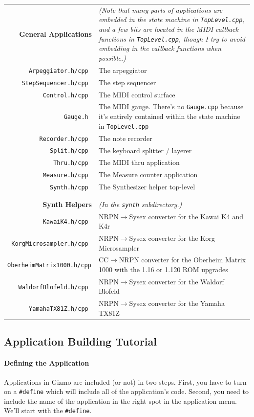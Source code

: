 \documentclass{article}
\begin{document}
\begin{tabular}{r@{\hspace{2em}}p{4.7in}}
	\bf General Applications  &		\it (Note that many parts of applications are embedded
				in the state machine in \texttt{TopLevel.cpp}, and a few bits
				are located in the MIDI callback functions in
				\texttt{TopLevel.cpp}, though I try to avoid embedding
				in the callback functions when possible.)\\
	\tt Arpeggiator.h/cpp & 	The arpeggiator \\ 
	\tt StepSequencer.h/cpp  & 	The step sequencer \\ 
	\tt Control.h/cpp	& 	The MIDI control surface \\ 
	\tt Gauge.h	& 		The MIDI gauge.  There's no \texttt{Gauge.cpp} because it's
				entirely contained within the state machine in
				{\texttt{TopLevel.cpp}} \\ 
	\tt Recorder.h/cpp	& 	The note recorder \\ 
	\tt Split.h/cpp	 & 	The keyboard splitter / layerer \\ 
	\tt Thru.h/cpp & 		The MIDI thru application \\ 
	\tt Measure.h/cpp	& The Measure counter application \\ 
	\tt Synth.h/cpp	& The Synthesizer helper top-level \\ 
\\
\\
	\bf Synth Helpers  & \it (In the \texttt{synth} subdirectory.)\\
	\tt KawaiK4.h/cpp	& 	NRPN\(\rightarrow\)Sysex converter for the Kawai K4 and K4r\\ 
	\tt KorgMicrosampler.h/cpp	& 	NRPN\(\rightarrow\)Sysex converter for the Korg Microsampler\\ 
	\tt OberheimMatrix1000.h/cpp	& 	CC\(\rightarrow\)NRPN converter for the Oberheim Matrix 1000 with the 1.16 or 1.120 ROM upgrades\\ 
	\tt WaldorfBlofeld.h/cpp	& 	NRPN\(\rightarrow\)Sysex converter for the Waldorf Blofeld\\ 
	\tt YamahaTX81Z.h/cpp	& 	NRPN\(\rightarrow\)Sysex converter for the Yamaha TX81Z\\ 
\end{tabular}




\subsection{Application Building Tutorial}

\paragraph{Defining the Application}
Applications in Gizmo are included (or not) in two steps.  First, you have to turn on a \texttt{\#define} which will include all of the application's code.  Second, you need to include the name of the application in the right spot in the application menu.  We'll start with the \texttt{\#define}.
\end{document}
